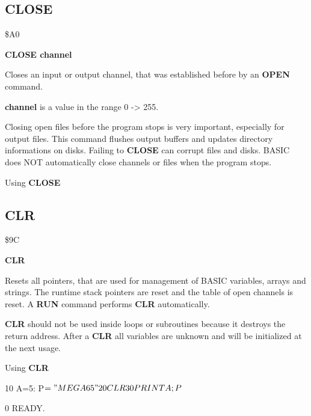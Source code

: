 \subsection{CLOSE}
\begin{description}[leftmargin=3cm,style=nextline]
\item [Token:] \$A0
\item [Format:] {\bf CLOSE channel}
\item [Usage:] Closes an input or output
               channel, that was established before by an {\bf OPEN}
               command.

               {\bf channel} is a value in the range 0 -> 255.

\item [Remarks:] Closing open files before the program stops is
               very important, especially for output files.
               This command flushes output buffers and
               updates directory informations on disks.
               Failing to {\bf CLOSE}  can corrupt files and disks.
               BASIC does NOT automatically close channels or files
               when the program stops.

\item [Example:] Using {\bf CLOSE}
\end{description}


\newpage
\subsection{CLR}
\begin{description}[leftmargin=3cm,style=nextline]
\item [Token:] \$9C
\item [Format:] {\bf CLR}
\item [Usage:] Resets all pointers, that
               are used for management of BASIC variables, arrays
               and strings. The runtime stack pointers are reset
               and the table of open channels is reset.
               A {\bf RUN} command performs {\bf CLR} automatically.

\item [Remarks:] {\bf CLR} should not be used inside loops or
               subroutines because it destroys the return address.
               After a {\bf CLR} all variables are unknown and will
               be initialized at the next usage.

\item [Example:] Using {\bf CLR}
\begin{screenoutput}
10 A=5: P$="MEGA 65"
20 CLR
30 PRINT A;P$

0
READY.
\end{screenoutput}
\end{description}

